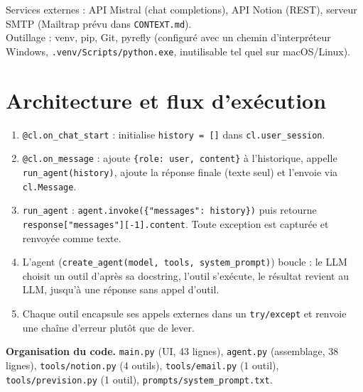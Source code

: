 \documentclass[10.5pt,a4paper]{article}
\newcommand{\code}[1]{\texttt{#1}}
\begin{document}
Services externes : API Mistral (chat completions), API Notion (REST), serveur SMTP (Mailtrap prévu dans \code{CONTEXT.md}).\\
Outillage : venv, pip, Git, pyrefly (configuré avec un chemin d'interpréteur Windows, \code{.venv/Scripts/python.exe}, inutilisable tel quel sur macOS/Linux).

\section{Architecture et flux d'exécution}
\begin{enumerate}[leftmargin=1.2cm]
  \item \code{@cl.on\_chat\_start} : initialise \code{history = []} dans \code{cl.user\_session}.
  \item \code{@cl.on\_message} : ajoute \code{\{role: user, content\}} à l'historique, appelle \code{run\_agent(history)}, ajoute la réponse finale (texte seul) et l'envoie via \code{cl.Message}.
  \item \code{run\_agent} : \code{agent.invoke(\{"messages": history\})} puis retourne \code{response["messages"][-1].content}. Toute exception est capturée et renvoyée comme texte.
  \item L'agent (\code{create\_agent(model, tools, system\_prompt)}) boucle : le LLM choisit un outil d'après sa docstring, l'outil s'exécute, le résultat revient au LLM, jusqu'à une réponse sans appel d'outil.
  \item Chaque outil encapsule ses appels externes dans un \code{try/except} et renvoie une chaîne d'erreur plutôt que de lever.
\end{enumerate}

\textbf{Organisation du code.} \code{main.py} (UI, 43 lignes), \code{agent.py} (assemblage, 38 lignes), \code{tools/notion.py} (4 outils), \code{tools/email.py} (1 outil), \code{tools/prevision.py} (1 outil), \code{prompts/system\_prompt.txt}.

\newpage
\end{document}
